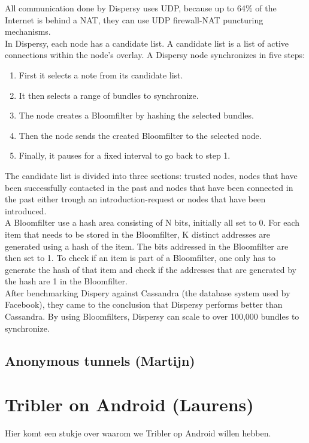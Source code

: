 \documentclass[11pt]{article}
\begin{document}
All communication done by Dispersy uses UDP, because up to 64\% of the Internet is behind a NAT, they can use UDP firewall-NAT puncturing mechanisms.\\

In Dispersy, each node has a candidate list. A candidate list is a list of active connections within the node's overlay. A Dispersy node synchronizes in five steps:

\begin{enumerate}
\item First it selects a note from its candidate list.
\item It then selects a range of bundles to synchronize.
\item The node creates a Bloomfilter by hashing the selected bundles.
\item Then the node sends the created Bloomfilter to the selected node.
\item Finally, it pauses for a fixed interval to go back to step 1.
\end{enumerate}

The candidate list is divided into three sections: trusted nodes, nodes that have been successfully contacted in the past and nodes that have been connected in the past either trough an introduction-request or nodes that have been introduced.\\

A Bloomfilter use a hash area consisting of N bits, initially all set to 0. For each item that needs to be stored in the Bloomfilter, K distinct addresses are generated using a hash of the item. The bits addressed in the Bloomfilter are then set to 1. To check if an item is part of a Bloomfilter, one only has to generate the hash of that item and check if the addresses that are generated by the hash are 1 in the Bloomfilter.\\

After benchmarking Dispery against Cassandra (the database system used by Facebook), they came to the conclusion that Dispersy performs better than Cassandra. By using Bloomfilters, Dispersy can scale to over 100,000 bundles to synchronize.


\subsection{Anonymous tunnels (Martijn)}

\section{Tribler on Android (Laurens)}
Hier komt een stukje over waarom we Tribler op Android willen hebben.
\end{document}
